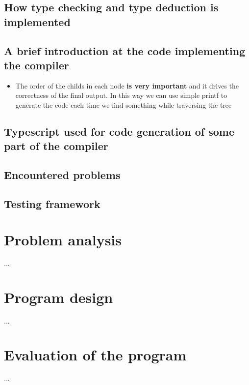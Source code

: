 \documentclass[a4paper]{article}
\begin{document}
\subsection{How type checking and type deduction is implemented}

\subsection{A brief introduction at the code implementing the compiler}

\begin{itemize}
    \item The order of the childs in each node \textbf{is very important} and it drives
        the correctness of the final output. In this way we can use simple printf to generate
        the code each time we find something while traversing the tree
\end{itemize}

\subsection{Typescript used for code generation of some part of the compiler}

\subsection{Encountered problems}

\subsection{Testing framework}


\section{Problem analysis}

...

\section{Program design}

...

\section{Evaluation of the program}

...

%
\end{document}
